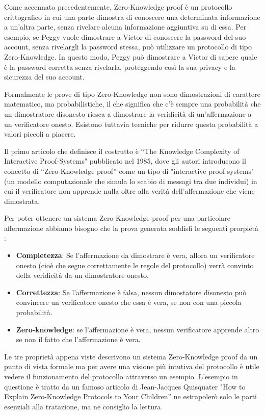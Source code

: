 Come accennato precedentemente, Zero-Knowledge proof è un protocollo crittografico in cui una parte dimostra di
conoscere una determinata informazione a un'altra parte, senza rivelare alcuna informazione aggiuntiva su di essa. Per
esempio, se Peggy vuole dimostrare a Victor di conoscere la password del suo account, senza rivelargli la password stessa,
può utilizzare un protocollo di tipo Zero-Knowledge. In questo modo, Peggy può dimostrare a Victor di sapere quale è la
password corretta senza rivelarla, proteggendo così la sua privacy e la sicurezza del suo account.

Formalmente le prove di tipo Zero-Knowledge non sono dimostrazioni di carattere matematico, ma probabilistiche, il che
significa che c'è sempre una probabilità che un dimostratore disonesto riesca a dimostrare la veridicità di
un'affermazione a un verificatore onesto. Esistono tuttavia tecniche per ridurre questa probabilità a valori piccoli a
piacere.

Il primo articolo che definisce il costrutto è “The Knowledge Complexity of Interactive Proof-Systems"\cite{10.1145/22145.22178} pubblicato nel
1985, dove  gli autori introducono il concetto di “Zero-Knowledge proof” come un tipo di "interactive proof
systems" \cite{interactive_proof_system} (un modello computazionale che simula lo scabio di
messagi tra due individui) in cui il verificatore non apprende nulla oltre alla verità dell'affermazione che viene
dimostrata.

Per poter ottenere un sistema Zero-Knowledge proof per una particolare affermazione abbiamo bisogno che la prova
generata soddisfi le seguenti prorpietà :
\begin{itemize}
    \item \textbf{Completezza}: Se l'affermazione da dimostrare è vera, allora un verificatore onesto (cioè che segue correttamente le
    regole del protocollo) verrà convinto della veridicità da un dimostratore onesto.
    \item \textbf{Correttezza}: Se l'affermazione è falsa, nessun dimostatore disonesto può convincere un verificatore onesto che essa è vera, se non con una piccola
    probabilità.
    \item \textbf{Zero-knowledge}: se l'affermazione è vera, nessun verificatore apprende altro se non il fatto che
    l'affermazione è vera.
\end{itemize}
Le tre proprietà appena viste descrivono un sistema Zero-Knowledge proof da un punto di vista formale ma per avere una visione più
intutiva del protocollo è utile vedere il funzionamento del protocollo attraverso un esempio. L’esempio in questione è tratto
da un famoso articolo di Jean-Jacques Quisquater "How to Explain Zero-Knowledge Protocols to Your Children” \cite{10.1007/0-387-34805-0_60}  ne
estrapolerò solo le parti esenziali alla tratazione, ma ne consiglio la lettura.

